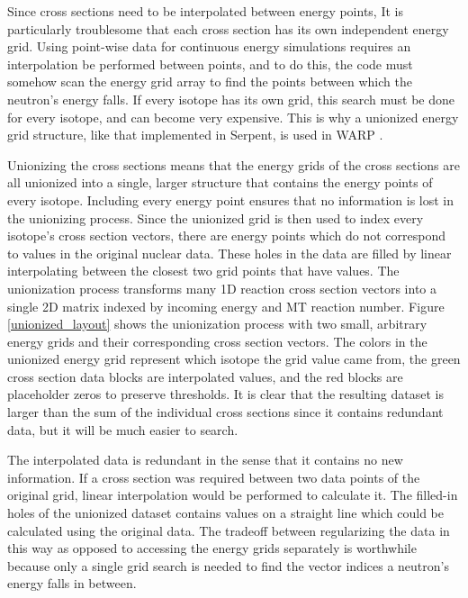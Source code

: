 Since cross sections need to be interpolated between energy points, It is particularly troublesome that each cross section has its own independent energy grid.  Using point-wise data for continuous energy simulations requires an interpolation be performed between points, and to do this, the code must somehow scan the energy grid array to find the points between which the neutron's energy falls.  If every isotope has its own grid, this search must be done for every isotope, and can become very expensive.  This is why a unionized energy grid structure, like that implemented in Serpent, is used in WARP \cite{jaakko_xs}.

Unionizing the cross sections means that the energy grids of the cross sections are all unionized into a single, larger structure that contains the energy points of every isotope.  Including every energy point ensures that no information is lost in the unionizing process.  Since the unionized grid is then used to index every isotope's cross section vectors, there are energy points which do not correspond to values in the original nuclear data.  These holes in the data are filled by linear interpolating between the closest two grid points that have values.  The unionization process transforms  many 1D reaction cross section vectors into a single 2D matrix indexed by incoming energy and MT reaction number.  Figure \ref{unionized_layout} shows the unionization process with two small, arbitrary energy grids and their corresponding cross section vectors.  The colors in the unionized energy grid represent which isotope the grid value came from, the green cross section data blocks are interpolated values, and the red blocks are placeholder zeros to preserve thresholds. It is clear that the resulting dataset is larger than the sum of the individual cross sections since it contains redundant data, but it will be much easier to search.  

The interpolated data is redundant in the sense that it contains no new information.  If a cross section was required between two data points of the original grid, linear interpolation would be performed to calculate it.  The filled-in holes of the unionized dataset contains values on a straight line which could be calculated using the original data.
 The tradeoff between regularizing the data in this way as opposed to accessing the energy grids separately is worthwhile because only a single grid search is needed to find the vector indices a neutron's energy falls in between.


